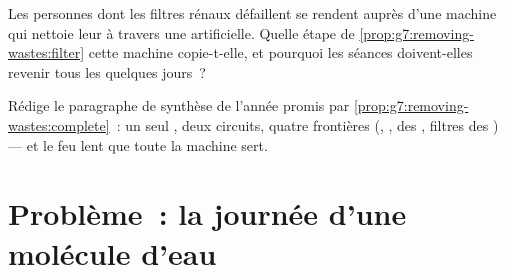 \begin{exercise}[$\star\star$]\label{exo:g7:removing-wastes:11}
Les personnes dont les filtres rénaux défaillent se rendent auprès
d'une machine qui nettoie leur  à travers une 
artificielle. Quelle étape de \cref{prop:g7:removing-wastes:filter}
cette machine copie-t-elle, et pourquoi les séances doivent-elles
revenir tous les quelques jours~?
\end{exercise}

\begin{exercise}[$\star\star\star$]\label{exo:g7:removing-wastes:12}
Rédige le paragraphe de synthèse de l'année promis par
\cref{prop:g7:removing-wastes:complete}~: un seul , deux
circuits, quatre frontières (, ,  des
, filtres des ) --- et le feu lent que toute la machine
sert.
\end{exercise}

\section{Problème~: la journée d'une molécule d'eau}

